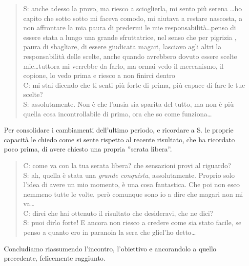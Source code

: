 \begin{verse}
S: anche adesso la provo, ma riesco a scioglierla, mi sento più serena \ldots ho capito che sotto sotto mi faceva comodo, mi aiutava a restare nascosta, a non affrontare la mia paura di predermi le mie responsabilità\ldots penso di essere stata a lungo una grande sfruttatrice, nel senso che per pigrizia , paura di sbagliare, di essere giudicata magari, lasciavo agli altri la responsabilità delle scelte, anche quando avrebbero dovuto essere scelte mie\ldots tuttora mi verrebbe da farlo, ma ormai vedo il meccanismo, il copione, lo vedo prima e riesco a non finirci dentro\\
C: mi stai dicendo che ti senti più forte di prima, più capace di fare le tue scelte?\\
S: assolutamente. Non è che l'ansia sia sparita del tutto, ma non è più quella cosa incontrollabile di prima, ora che so come funziona\ldots
\end{verse}

Per consolidare i cambiamenti dell'ultimo periodo, e ricordare a S. le proprie capacità le chiedo come si sente rispetto al recente risultato, che ha ricordato poco prima, di avere chiesto una propria ''serata libera''.

\begin{verse}
C: come va con la tua serata libera? che sensazioni provi al riguardo?\\
S: ah, quella è stata una \emph{grande conquista}, assolutamente. Proprio solo l'idea di avere un mio momento, è una cosa fantastica. Che poi non esco nemmeno tutte le volte, però comunque sono io a dire che magari non mi va\ldots\\
C: direi che hai ottenuto il risultato che desideravi, che ne dici?\\
S: puoi dirlo forte! E ancora non riesco a credere come sia stato facile, se penso a quanto ero in paranoia la sera che gliel'ho detto\ldots\\
\end{verse}

\noindent Concludiamo riassumendo l'incontro, l'obiettivo e ancorandolo a quello precedente, felicemente raggiunto.

